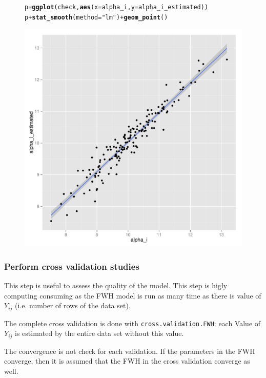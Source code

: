 \documentclass{article}\usepackage[]{graphicx}\usepackage[]{color}
\makeatletter
\newcommand{\hlstr}[1]{\textcolor[rgb]{0.192,0.494,0.8}{#1}}%
\newcommand{\hlopt}[1]{\textcolor[rgb]{0,0,0}{#1}}%
\newcommand{\hlstd}[1]{\textcolor[rgb]{0.345,0.345,0.345}{#1}}%
\newcommand{\hlkwb}[1]{\textcolor[rgb]{0.69,0.353,0.396}{#1}}%
\newcommand{\hlkwc}[1]{\textcolor[rgb]{0.333,0.667,0.333}{#1}}%
\newcommand{\hlkwd}[1]{\textcolor[rgb]{0.737,0.353,0.396}{\textbf{#1}}}%
\newenvironment{kframe}{%
 \def\at@end@of@kframe{}%
 \ifinner\ifhmode%
  \def\at@end@of@kframe{\end{minipage}}%
  \begin{minipage}{\columnwidth}%
 \fi\fi%
 \def\FrameCommand##1{\hskip\@totalleftmargin \hskip-\fboxsep
 \colorbox{shadecolor}{##1}\hskip-\fboxsep
     \hskip-\linewidth \hskip-\@totalleftmargin \hskip\columnwidth}%
 \MakeFramed {\advance\hsize-\width
   \@totalleftmargin\z@ \linewidth\hsize
   \@setminipage}}%
 {\par\unskip\endMakeFramed%
 \at@end@of@kframe}
\newenvironment{knitrout}{}{} %
\makeatother
\begin{document}
\begin{figure}[H]
\begin{knitrout}
\color{fgcolor}\begin{kframe}
\begin{alltt}
\hlstd{p} \hlkwb{=} \hlkwd{ggplot}\hlstd{(check,} \hlkwd{aes}\hlstd{(}\hlkwc{x} \hlstd{= alpha_i,} \hlkwc{y} \hlstd{= alpha_i_estimated))}
\hlstd{p} \hlopt{+} \hlkwd{stat_smooth}\hlstd{(}\hlkwc{method} \hlstd{=} \hlstr{"lm"}\hlstd{)} \hlopt{+} \hlkwd{geom_point}\hlstd{()}
\end{alltt}
\end{kframe}

{\centering \includegraphics[width=.6\textwidth]{figures/PPBstats_unnamed-chunk-42-1} 

}



\end{knitrout}
\end{figure}


\subsubsection{Perform cross validation studies}

This step is useful to assess the quality of the model.
This step is higly computing consuming as the FWH model is run as many time as there is value of $Y_{ij}$ (i.e. number of rows of the data set).

The complete cross validation is done with \texttt{cross.validation.FWH}: 
each Value of $Y_{ij}$ is estimated by the entire data set without this value.

The convergence is not check for each validation. 
If the parameters in the FWH converge, then it is assumed that the FWH in the cross validation converge as well.
\end{document}
